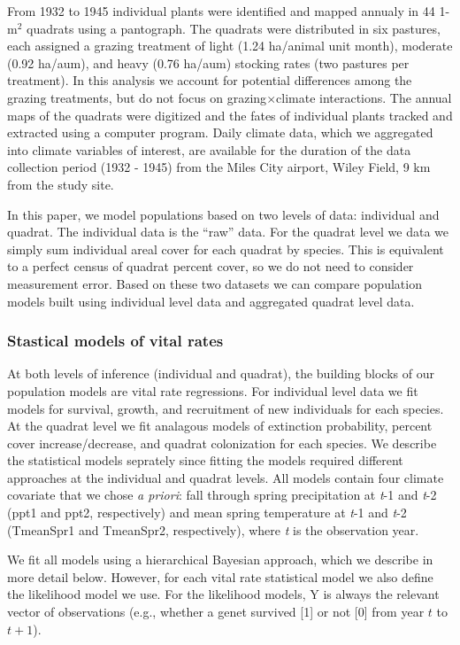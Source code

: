 \documentclass[12pt,]{article}
\begin{document}
From 1932 to 1945 individual plants were identified and mapped annualy
in 44 1-$\text{m}^2$ quadrats using a pantograph. The quadrats were
distributed in six pastures, each assigned a grazing treatment of light
(1.24 ha/animal unit month), moderate (0.92 ha/aum), and heavy (0.76
ha/aum) stocking rates (two pastures per treatment). In this analysis we
account for potential differences among the grazing treatments, but do
not focus on grazing$\times$climate interactions. The annual maps of the
quadrats were digitized and the fates of individual plants tracked and
extracted using a computer program. Daily climate data, which we
aggregated into climate variables of interest, are available for the
duration of the data collection period (1932 - 1945) from the Miles City
airport, Wiley Field, 9 km from the study site.

In this paper, we model populations based on two levels of data:
individual and quadrat. The individual data is the ``raw'' data. For the
quadrat level we data we simply sum individual areal cover for each
quadrat by species. This is equivalent to a perfect census of quadrat
percent cover, so we do not need to consider measurement error. Based on
these two datasets we can compare population models built using
individual level data and aggregated quadrat level data.

\subsubsection{Stastical models of vital
rates}\label{stastical-models-of-vital-rates}

At both levels of inference (individual and quadrat), the building
blocks of our population models are vital rate regressions. For
individual level data we fit models for survival, growth, and
recruitment of new individuals for each species. At the quadrat level we
fit analagous models of extinction probability, percent cover
increase/decrease, and quadrat colonization for each species. We
describe the statistical models seprately since fitting the models
required different approaches at the individual and quadrat levels. All
models contain four climate covariate that we chose \emph{a priori}:
fall through spring precipitation at \emph{t}-1 and \emph{t}-2 (ppt1 and
ppt2, respectively) and mean spring temperature at \emph{t}-1 and
\emph{t}-2 (TmeanSpr1 and TmeanSpr2, respectively), where \emph{t} is
the observation year.

We fit all models using a hierarchical Bayesian approach, which we
describe in more detail below. However, for each vital rate statistical
model we also define the likelihood model we use. For the likelihood
models, Y is always the relevant vector of observations (e.g., whether a
genet survived {[}1{]} or not {[}0{]} from year $t$ to $t+1$).
\end{document}
